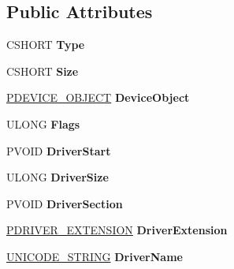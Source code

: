 \subsection*{Public Attributes}
\begin{DoxyCompactItemize}
\item 
\hypertarget{struct__DRIVER__OBJECT_a80102a79b46d8ae8c097b5070ee6654a}{}C\+S\+H\+O\+R\+T {\bfseries Type}\label{struct__DRIVER__OBJECT_a80102a79b46d8ae8c097b5070ee6654a}

\item 
\hypertarget{struct__DRIVER__OBJECT_a6ce206fa4c79e6f591d07d269956e7b7}{}C\+S\+H\+O\+R\+T {\bfseries Size}\label{struct__DRIVER__OBJECT_a6ce206fa4c79e6f591d07d269956e7b7}

\item 
\hypertarget{struct__DRIVER__OBJECT_aa53b7e6c1566d9260b3d83a77b486af6}{}\hyperlink{struct__DEVICE__OBJECT}{P\+D\+E\+V\+I\+C\+E\+\_\+\+O\+B\+J\+E\+C\+T} {\bfseries Device\+Object}\label{struct__DRIVER__OBJECT_aa53b7e6c1566d9260b3d83a77b486af6}

\item 
\hypertarget{struct__DRIVER__OBJECT_aeeeeb24f7c061f50df72e6d527bd2480}{}U\+L\+O\+N\+G {\bfseries Flags}\label{struct__DRIVER__OBJECT_aeeeeb24f7c061f50df72e6d527bd2480}

\item 
\hypertarget{struct__DRIVER__OBJECT_a15dd1ea21612b2d23087a7791794734a}{}P\+V\+O\+I\+D {\bfseries Driver\+Start}\label{struct__DRIVER__OBJECT_a15dd1ea21612b2d23087a7791794734a}

\item 
\hypertarget{struct__DRIVER__OBJECT_a794427f841f09f738f8b7d3cdc482b50}{}U\+L\+O\+N\+G {\bfseries Driver\+Size}\label{struct__DRIVER__OBJECT_a794427f841f09f738f8b7d3cdc482b50}

\item 
\hypertarget{struct__DRIVER__OBJECT_a3a9528958da88c3aface7225fef57201}{}P\+V\+O\+I\+D {\bfseries Driver\+Section}\label{struct__DRIVER__OBJECT_a3a9528958da88c3aface7225fef57201}

\item 
\hypertarget{struct__DRIVER__OBJECT_a7e5dc9baae90572acab2d120eb80777c}{}\hyperlink{struct__DRIVER__EXTENSION}{P\+D\+R\+I\+V\+E\+R\+\_\+\+E\+X\+T\+E\+N\+S\+I\+O\+N} {\bfseries Driver\+Extension}\label{struct__DRIVER__OBJECT_a7e5dc9baae90572acab2d120eb80777c}

\item 
\hypertarget{struct__DRIVER__OBJECT_ad9f9e0f5c2b147cc664df4116a13c877}{}\hyperlink{struct__UNICODE__STRING}{U\+N\+I\+C\+O\+D\+E\+\_\+\+S\+T\+R\+I\+N\+G} {\bfseries Driver\+Name}\label{struct__DRIVER__OBJECT_ad9f9e0f5c2b147cc664df4116a13c877}


\end{DoxyCompactItemize}
